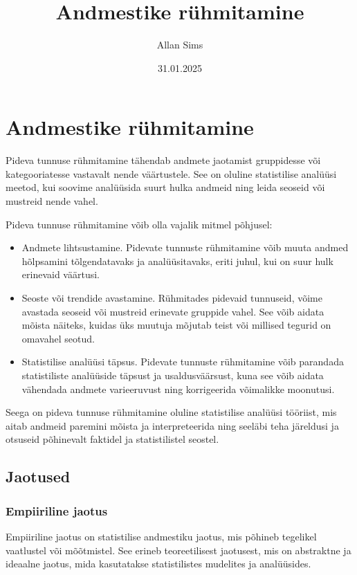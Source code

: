 \documentclass[
]{article}
\title{Andmestike rühmitamine}
\author{Allan Sims}
\date{31.01.2025}
\begin{document}
\maketitle

\section{Andmestike rühmitamine}\label{andmestike-ruxfchmitamine}

Pideva tunnuse rühmitamine tähendab andmete jaotamist gruppidesse või
kategooriatesse vastavalt nende väärtustele. See on oluline statistilise
analüüsi meetod, kui soovime analüüsida suurt hulka andmeid ning leida
seoseid või mustreid nende vahel.

Pideva tunnuse rühmitamine võib olla vajalik mitmel põhjusel:

\begin{itemize}
\item
  Andmete lihtsustamine. Pidevate tunnuste rühmitamine võib muuta andmed
  hõlpsamini tõlgendatavaks ja analüüsitavaks, eriti juhul, kui on suur
  hulk erinevaid väärtusi.
\item
  Seoste või trendide avastamine. Rühmitades pidevaid tunnuseid, võime
  avastada seoseid või mustreid erinevate gruppide vahel. See võib
  aidata mõista näiteks, kuidas üks muutuja mõjutab teist või millised
  tegurid on omavahel seotud.
\item
  Statistilise analüüsi täpsus. Pidevate tunnuste rühmitamine võib
  parandada statistiliste analüüside täpsust ja usaldusväärsust, kuna
  see võib aidata vähendada andmete varieeruvust ning korrigeerida
  võimalikke moonutusi.
\end{itemize}

Seega on pideva tunnuse rühmitamine oluline statistilise analüüsi
tööriist, mis aitab andmeid paremini mõista ja interpreteerida ning
seeläbi teha järeldusi ja otsuseid põhinevalt faktidel ja statistilistel
seostel.

\subsection{Jaotused}\label{jaotused}

\subsubsection{Empiiriline jaotus}\label{empiiriline-jaotus}

Empiiriline jaotus on statistilise andmestiku jaotus, mis põhineb
tegelikel vaatlustel või mõõtmistel. See erineb teoreetilisest
jaotusest, mis on abstraktne ja ideaalne jaotus, mida kasutatakse
statistilistes mudelites ja analüüsides.
\end{document}
